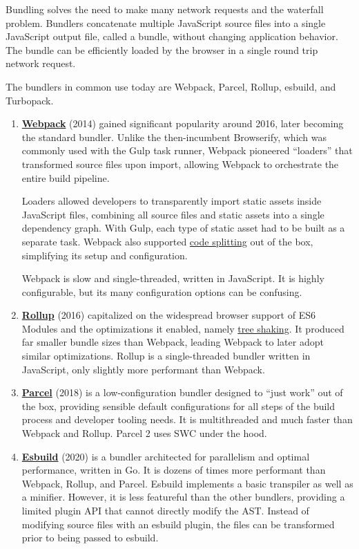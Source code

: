 \documentclass{article}
\newcommand{\tb}{\textbf}
\newcommand{\hl}{\hyperlink}
\begin{document}
Bundling solves the need to make many network requests and the waterfall problem. Bundlers
concatenate multiple JavaScript source files into a single JavaScript output file, called a bundle,
without changing application behavior. The bundle can be efficiently loaded by the browser in a
single round trip network request.

The bundlers in common use today are Webpack, Parcel, Rollup, esbuild, and Turbopack.

\begin{enumerate}
  \item \href{https://webpack.js.org/}{\tb{Webpack}} (2014) gained significant popularity around
    2016, later becoming the standard bundler. Unlike the then-incumbent Browserify, which was
    commonly used with the Gulp task runner, Webpack pioneered ``loaders'' that transformed source
    files upon import, allowing Webpack to orchestrate the entire build pipeline.

    Loaders allowed developers to transparently import static assets inside JavaScript files,
    combining all source files and static assets into a single dependency graph. With Gulp, each
    type of static asset had to be built as a separate task. Webpack also supported
    \hl{code-splitting}{code splitting} out of the box, simplifying its setup and configuration.

    Webpack is slow and single-threaded, written in JavaScript. It is highly configurable, but its
    many configuration options can be confusing.

  \item \href{https://rollupjs.org/}{\tb{Rollup}} (2016) capitalized on the widespread browser
    support of ES6 Modules and the optimizations it enabled, namely \hl{tree-shaking}{tree shaking}.
    It produced far smaller bundle sizes than Webpack, leading Webpack to later adopt similar
    optimizations. Rollup is a single-threaded bundler written in JavaScript, only slightly more
    performant than Webpack.

  \item \href{https://parceljs.org/}{\tb{Parcel}} (2018) is a low-configuration bundler designed to
    ``just work'' out of the box, providing sensible default configurations for all steps of the
    build process and developer tooling needs. It is multithreaded and much faster than Webpack and
    Rollup. Parcel 2 uses SWC under the hood.

  \item \href{https://esbuild.github.io/}{\tb{Esbuild}} (2020) is a bundler architected for
    parallelism and optimal performance, written in Go. It is dozens of times more performant than
    Webpack, Rollup, and Parcel. Esbuild implements a basic transpiler as well as a minifier.
    However, it is less featureful than the other bundlers, providing a limited plugin API that
    cannot directly modify the AST. Instead of modifying source files with an esbuild plugin, the
    files can be transformed prior to being passed to esbuild.


\end{enumerate}
\end{document}
